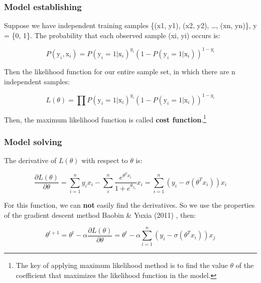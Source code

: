 \documentclass[12pt,a4paper,]{article}
\let\rmarkdownfootnote\footnote%
\def\footnote{\protect\rmarkdownfootnote}
\begin{document}
\hypertarget{model-establishing-1}{%
\subsubsection{Model establishing}\label{model-establishing-1}}

Suppose we have independent training samples \{(x1, y1), (x2, y2),
\ldots{}, (xn, yn)\}, y = \{0, 1\}. The probability that each observed
sample (xi, yi) occurs is:

\begin{equation}
P\left(\mathrm{y}_{i}, \mathrm{x}_{i}\right)=P\left(\mathrm{y}_{i}=1 | \mathrm{x}_{i}\right)^{y_{i}}\left(1-P\left(\mathrm{y}_{i}=1 | \mathrm{x}_{i}\right)\right)^{1-y_{i}}
\end{equation}

Then the likelihood function for our entire sample set, in which there
are n independent samples:

\begin{equation}
L(\theta)=\prod P\left(\mathrm{y}_{i}=1 | \mathrm{x}_{i}\right)^{y_{i}}\left(1-P\left(\mathrm{y}_{i}=1 | \mathrm{x}_{i}\right)\right)^{1-y_{i}}
\end{equation}

Then, the maximum likelihood function is called \textbf{cost
function}.\footnote{The key of applying maximum likelihood method is to
  find the value \(\theta\) of the coefficient that maximizes the
  likelihood function in the model.}

\hypertarget{model-solving}{%
\subsubsection{Model solving}\label{model-solving}}

The derivative of \(L(\theta)\) with respect to \(\theta\) is:

\begin{equation}
\frac{\partial L(\theta)}{\partial \theta}=\sum_{i=1}^{n} y_{i} x_{i}-\sum_{i}^{n} \frac{e^{\theta^{T} x_{i}}}{1+e^{\theta_{x_{i}}}} x_{i}=\sum_{i=1}^{n}\left(y_{i}-\sigma\left(\theta^{T} x_{i}\right)\right) x_{i}
\end{equation}

For this function, we can \textbf{not} easily find the derivatives. So
we use the properties of the gradient descent method Baobin \& Yuxia
(2011) , then:

\begin{equation}
\theta^{t+1}=\theta^{t}-\alpha \frac{\partial L(\theta)}{\partial \theta}=\theta^{t}-\alpha \sum_{i=1}^{n}\left(y_{i}-\sigma\left(\theta^{T} x_{i}\right)\right) x_{j}
\end{equation}
\end{document}
